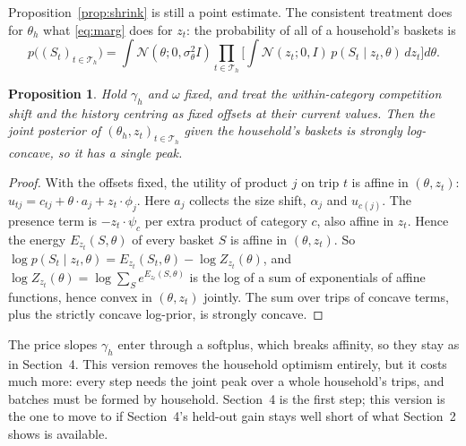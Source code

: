 \documentclass[11pt]{article}
\newtheorem{proposition}{Proposition}
\theoremstyle{remark}\newtheorem{remark}{Remark}
\newcommand{\N}{\mathcal{N}}
\begin{document}
Proposition~\ref{prop:shrink} is still a point estimate. The consistent treatment does for $\theta_h$
what \eqref{eq:marg} does for $z_t$: the probability of all of a household's baskets is
\begin{equation}\label{eq:hh}
p\big((S_t)_{t\in\mathcal T_h}\big)=\int \N(\theta;0,\sigma_\theta^2 I)\prod_{t\in\mathcal T_h}\Big[\int\N(z_t;0,I)\,p(S_t\mid z_t,\theta)\,dz_t\Big]d\theta .
\end{equation}
\begin{proposition}\label{prop:joint}
Hold $\gamma_h$ and $\omega$ fixed, and treat the within-category competition shift and the
history centring as fixed offsets at their current values. Then the joint posterior of $(\theta_h,z_{t})_{t\in\mathcal T_h}$
given the household's baskets is strongly log-concave, so it has a single peak.
\end{proposition}
\begin{proof}
With the offsets fixed, the utility of product $j$ on trip $t$ is affine in $(\theta,z_t)$:
$u_{tj}=c_{tj}+\theta\cdot a_j+z_t\cdot\phi_j$. Here $a_j$ collects the size shift, $\alpha_j$ and
$u_{c(j)}$. The presence term is $-z_t\cdot\psi_c$ per extra product of category $c$, also affine
in $z_t$. Hence the energy $E_{z_t}(S,\theta)$ of every basket $S$ is affine in $(\theta,z_t)$.
So $\log p(S_t\mid z_t,\theta)=E_{z_t}(S_t,\theta)-\log Z_{z_t}(\theta)$, and
$\log Z_{z_t}(\theta)=\log\sum_S e^{E_{z_t}(S,\theta)}$ is the log of a sum of exponentials of affine
functions, hence convex in $(\theta,z_t)$ jointly. The sum over trips of concave terms, plus the strictly concave log-prior, is strongly concave.
\end{proof}
\noindent The price slopes $\gamma_h$ enter through a softplus, which breaks affinity, so they stay as in
Section~4. This version removes the household optimism entirely, but it costs much more: every step
needs the joint peak over a whole household's trips, and batches must be formed by household.
Section~4 is the first step; this version is the one to move to if Section~4's held-out gain stays
well short of what Section~2 shows is available.

\end{document}
